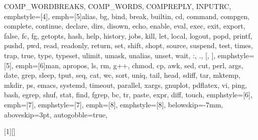 {{         COMP_WORDBREAKS, COMP_WORDS, COMPREPLY, INPUTRC},
emphstyle=[4]{\color{environment-color}}, %
emph=[5]{alias, bg, bind, break, builtin, cd, command, compgen, complete, continue, declare, dirs, disown, echo, enable, eval,
         exec, exit, export, false, fc, fg, getopts, hash, help, history, jobs, kill, let, local, logout, popd, printf, pushd, pwd,
         read, readonly, return, set, shift, shopt, source, suspend, test, times, trap, true, type, typeset, ulimit, umask,
         unalias, unset, wait, :, ., [, ]},
emphstyle=[5]{\color{builtins-color}}, %
emph=[6]{man, apropos, ls, rm, g++, chmod, cp, awk, sed, cut, perl, args, date, grep, sleep, tput, seq, cat, wc, sort, uniq, tail,
         head, sdiff, tar, mktemp, mkdir, ps, emacs, systemd, timeout, parallel, xargs, gnuplot, pdflatex, vi, ping, bash,
         egrep, shuf, stat, find, fgrep, bc, tr, paste, expr, diff, touch},
emphstyle=[6]{\color{external-color}}, %
emph=[7]{},
emphstyle=[7]{\color{variables-color}}, %
emph=[8]{},
emphstyle=[8]{\color{builtins-color}}, %
%
belowskip=-7mm,
aboveskip=3pt,
autogobble=true, %
}

[1][] %
    {\lstset{style=MyBash, #1}}
    {}

\def\bash{\lstinline[style=MyBash, basicstyle=\ttfamily\color{black}]}


